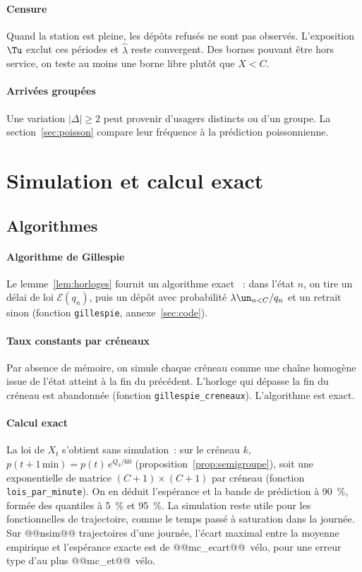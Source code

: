 \paragraph{Censure} Quand la station est pleine, les dépôts refusés ne sont pas observés. L'exposition $\Tu$ exclut ces périodes et $\hat\lambda$ reste convergent. Des bornes pouvant être hors service, on teste \og au moins une borne libre\fg{} plutôt que $X<C$.

\paragraph{Arrivées groupées} Une variation $|\Delta|\geq2$ peut provenir d'usagers distincts ou d'un groupe. La section~\ref{sec:poisson} compare leur fréquence à la prédiction poissonnienne.

\section{Simulation et calcul exact}\label{sec:simulation}

\subsection{Algorithmes}

\paragraph{Algorithme de Gillespie} Le lemme~\ref{lem:horloges} fournit un algorithme exact \cite{Gil77}~: dans l'état $n$, on tire un délai de loi $\mathcal{E}(q_n)$, puis un dépôt avec probabilité $\lambda\un_{n<C}/q_n$ et un retrait sinon (fonction \texttt{gillespie}, annexe~\ref{sec:code}).

\paragraph{Taux constants par créneaux} Par absence de mémoire, on simule chaque créneau comme une chaîne homogène issue de l'état atteint à la fin du précédent. L'horloge qui dépasse la fin du créneau est abandonnée (fonction \texttt{gillespie\_creneaux}). L'algorithme est exact.

\paragraph{Calcul exact} La loi de $X_t$ s'obtient sans simulation~: sur le créneau $k$, $p(t+1\,\mathrm{min})=p(t)\,e^{Q_k/60}$ (proposition~\ref{prop:semigroupe}), soit une exponentielle de matrice $(C+1)\times(C+1)$ par créneau (fonction \texttt{lois\_par\_minute}). On en déduit l'espérance et la bande de prédiction à 90~\%, formée des quantiles à 5~\% et 95~\%. La simulation reste utile pour les fonctionnelles de trajectoire, comme le temps passé à saturation dans la journée. Sur @@nsim@@ trajectoires d'une journée, l'écart maximal entre la moyenne empirique et l'espérance exacte est de @@mc_ecart@@~vélo, pour une erreur type d'au plus @@mc_et@@~vélo.

